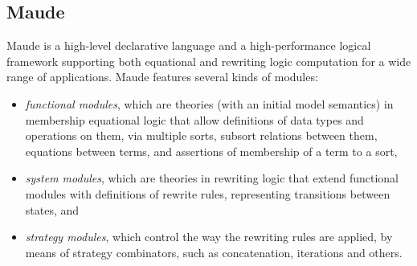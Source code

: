 \newcommand{\flip}{\mathsf{flip}}
\newcommand{\id}{\mathsf{id}}
\newcommand{\adv}{\mathsf{adv}}
\newcommand{\Alice}{\mathsf{Alice}}
\newcommand{\In}{\mathsf{In}}
\newcommand{\Ctxt}{\mathsf{Ctxt}}
\newcommand{\Key}{\mathsf{Key}}
\newcommand{\LeakCtxt}{\mathsf{LeakCtxt}}
\subsection{Maude}

Maude \cite{DBLP:conf/maude/2007} is a high-level declarative
language and 
a high-performance logical framework supporting both equational and rewriting logic computation for a wide range of applications. 
Maude features several kinds of modules:
\begin{itemize}
\item \emph{functional modules}, which are theories (with an initial
model semantics) in 
membership equational logic that allow definitions of 
data types and operations on them, via multiple sorts, subsort
relations between them, equations between terms, and
assertions of membership of a term to a sort,
\item \emph{system modules}, which are theories in rewriting logic
that extend functional modules with
definitions of rewrite rules, representing transitions between states, and
\item \emph{strategy modules}, which control 
the way the rewriting rules are applied, by means of strategy combinators,
such as concatenation, iterations and others.
\end{itemize}

